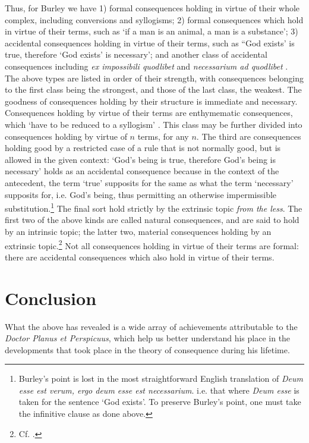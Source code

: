 \documentclass[]{article}
\begin{document}
Thus, for Burley we have 1) formal consequences holding in virtue of their whole complex, including conversions and syllogisms; 2) formal consequences which hold in virtue of their terms, such as `if a man is an animal, a man is a substance'; 3) accidental consequences holding in virtue of their terms, such as ``God exists' is true, therefore `God exists' is necessary'; and another class of accidental consequences including \textit{ex impossibili quodlibet} and \textit{necessarium ad quodlibet} \cite[pp. 128-129, par. 70]{Green-Pedersen1980b}. The above types are listed in order of their strength, with consequences belonging to the first class being the strongest, and those of the last class, the weakest. The goodness of consequences holding by their structure is immediate and necessary. Consequences holding by virtue of their terms are enthymematic consequences, which `have to be reduced to a syllogism' \cite[p. 142, par. 117]{Green-Pedersen1980b}. This class may be further divided into consequences holding by virtue of $n$ terms, for any $n$. The third are consequences holding good by a restricted case of a rule that is not normally good, but is allowed in the given context: `God's being is true, therefore God's being is necessary' holds as an accidental consequence because in the context of the antecedent, the term `true' supposits for the same as what the term `necessary' supposits for, i.e. God's being, thus permitting an otherwise impermissible substitution.\footnote{Burley's point is lost in the most straightforward English translation of \textit{Deum esse est verum, ergo deum esse est necessarium}. i.e. that where \textit{Deum esse} is taken for the sentence `God exists'. To preserve Burley's point, one must take the infinitive clause as done above.} The final sort hold strictly by the extrinsic topic \textit{from the less}. The first two of the above kinds are called natural consequences, and are said to hold by an intrinsic topic; the latter two, material consequences holding by an extrinsic topic.\footnote{Cf. \cite[p. 130]{Martin2004}.} Not all consequences holding in virtue of their terms are formal: there are accidental consequences which also hold in virtue of their terms.

\section{Conclusion}
What the above has revealed is a wide array of achievements attributable to the \textit{Doctor Planus et Perspicuus}, which help us better understand his place in the developments that took place in the theory of consequence during his lifetime. 
\end{document}
